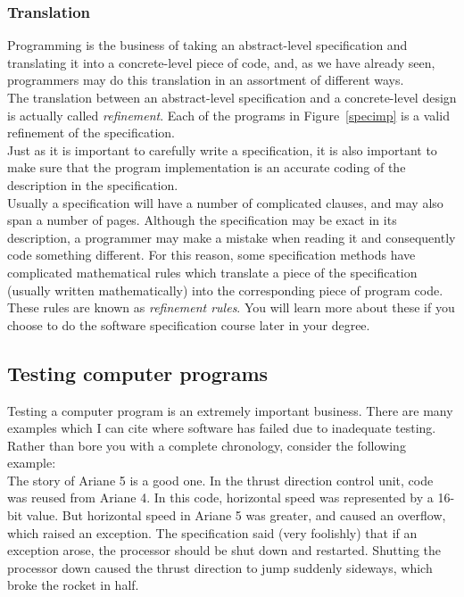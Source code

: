 \subsubsection{Translation}

Programming is the business of taking an abstract-level specification
and translating it into a concrete-level piece of code, and, as we have already seen,  programmers may
do this translation in an assortment of different ways. \\

\noindent
The translation between an abstract-level specification and a concrete-level
design is actually called {\em refinement}. Each of the programs
in Figure~\ref{specimp} is a valid refinement of the specification. \\

\noindent
Just as it is important to carefully write a specification, it is also 
important to make sure that the program implementation is an accurate
coding of the description in the specification. \\

\noindent
Usually a specification will have a number of complicated clauses, and 
may also span a number of pages. Although the specification 
may be exact in its description, a programmer may make a mistake 
when reading it and consequently code something different. For this 
reason, some specification methods have complicated mathematical rules 
which translate a piece of the specification (usually written mathematically)
into the corresponding piece of program code. These rules are 
known as {\em refinement rules}. You will learn more about these if
you choose to do the software specification course later in your degree.
 

\subsection{Testing computer programs}

Testing a computer program is an extremely important business. There are many
examples which I can cite where software has failed due to inadequate testing.
 Rather than 
bore you with a complete chronology, consider the following example:\\

\noindent
The story of Ariane 5 is a good one.
In the thrust direction control unit, 
code was reused from Ariane 4.
In this code, horizontal speed was represented
by a 16-bit value.
But horizontal speed in Ariane 5 was greater,
and caused an overflow, which raised an exception.
The specification said (very foolishly) that
if an exception arose, the processor should be 
shut down and restarted.
Shutting the processor down caused the thrust
direction to jump suddenly sideways, which
broke the rocket in half.\\

